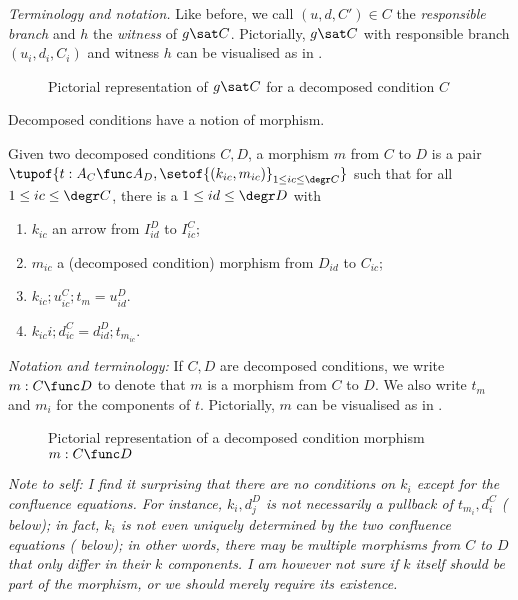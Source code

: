 \emph{Terminology and notation.} Like before, we call $(u,d,C')\in C$ the \emph{responsible branch} and $h$ the \emph{witness} of $g\sat C$. Pictorially, $g\sat C$ with responsible branch $(u_i,d_i,C_i)$ and witness $h$ can be visualised as in .
%
\begin{figure}
  \centering
  
  \caption{Pictorial representation of $g\sat C$ for a decomposed condition $C$}
\end{figure}

\medskip\noindent
Decomposed conditions have a notion of morphism.

\begin{definition}
  Given two decomposed conditions $C,D$, a morphism $m$ from $C$ to $D$ is a pair $\tupof{t:A_C\func A_D,\setof{(k_{ic},m_{ic})}_{1\leq ic\leq \degr C}}$ such that for all $1\leq ic\leq \degr C$, there is a $1\leq id\leq \degr D$ with
  \begin{enumerate}
  \item $k_{ic}$ an arrow from $I_{id}^D$ to $I_{ic}^C$;
  \item $m_{ic}$ a (decomposed condition) morphism from $D_{id}$ to $C_{ic}$;
  \item $k_{ic};u_{ic}^C;t_m=u_{id}^D$.
  \item $k_{ic}i;d_{ic}^C=d_{id}^D;t_{m_{ic}}$.
  \end{enumerate}
\end{definition}
%
\emph{Notation and terminology:} If $C,D$ are decomposed conditions, we write $m:C\func D$ to denote that $m$ is a morphism from $C$ to $D$. We also write $t_m$ and $m_i$ for the components of $t$. Pictorially, $m$ can be visualised as in .
%
\begin{figure}
  \centering
  
  \caption{Pictorial representation of a decomposed condition morphism $m:C\func D$}
\end{figure}

\medskip\noindent
\emph{Note to self: I find it surprising that there are no conditions on $k_i$ except for the confluence equations. For instance, $k_i,d_j^D$ is \emph{not} necessarily a pullback of $t_{m_i},d_i^C$ ( below); in fact, $k_i$ is \emph{not even} uniquely determined by the two confluence equations ( below); in other words, there may be multiple morphisms from $C$ to $D$ that only differ in their $k$ components. I am however not sure if $k$ itself should be part of the morphism, or we should merely require its existence.}

